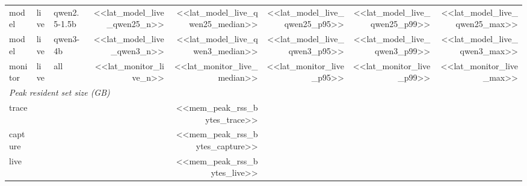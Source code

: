 \begin{tabular}{lllrrrrr}
model & live & qwen2.5-1.5b & <<lat_model_live_qwen25_n>> & <<lat_model_live_qwen25_median>> & <<lat_model_live_qwen25_p95>> & <<lat_model_live_qwen25_p99>> & <<lat_model_live_qwen25_max>> \\
model & live & qwen3-4b & <<lat_model_live_qwen3_n>> & <<lat_model_live_qwen3_median>> & <<lat_model_live_qwen3_p95>> & <<lat_model_live_qwen3_p99>> & <<lat_model_live_qwen3_max>> \\
monitor & live & all & <<lat_monitor_live_n>> & <<lat_monitor_live_median>> & <<lat_monitor_live_p95>> & <<lat_monitor_live_p99>> & <<lat_monitor_live_max>> \\
\midrule
\multicolumn{8}{l}{\emph{Peak resident set size (GB)}} \\
trace & & & & <<mem_peak_rss_bytes_trace>> & & & \\
capture & & & & <<mem_peak_rss_bytes_capture>> & & & \\
live & & & & <<mem_peak_rss_bytes_live>> & & & \\
\bottomrule
\end{tabular}
